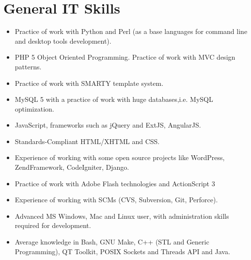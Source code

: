 \documentclass[a4paper,10pt]{article}
\begin{document}
\section{General IT Skills}
\begin{itemize}
  \item[] Practice of work with Python and Perl (as a base languages for
  command line and desktop tools development).

	\item[] PHP 5 Object Oriented Programming. Practice of work with MVC design
	patterns.

	\item[] Practice of work with SMARTY template system.

	\item[] MySQL 5 with a practice of work with huge databases,i.e. MySQL
		optimization.

	\item[] JavaScript, frameworks such as jQuery and ExtJS, AngularJS.

	\item[] Standards-Compliant HTML/XHTML and CSS.

	\item[] Experience of working with some open source projects like WordPress,
		ZendFramework, CodeIgniter, Django.

	\item[] Practice of work with Adobe Flash technologies and
		ActionScript 3

	\item[] Experience of working with SCMs (CVS, Subversion, Git, Perforce).

	\item[] Advanced MS Windows, Mac and Linux user, with administration skills required
		for development.

	\item[] Average knowledge in Bash, GNU Make, C++ (STL and Generic
		Programming), QT Toolkit, POSIX Sockets and Threads API and Java.
\end{itemize}

\end{document}
